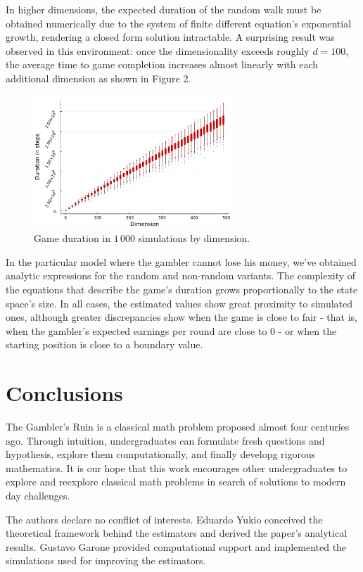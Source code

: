 \documentclass[a4paper,10pt,twocolumn]{article}
\begin{document}
In higher dimensions, the expected duration of the random walk must be obtained
numerically due to the system of finite different equation's exponential growth,
rendering a closed form solution intractable. A surprising result was observed
in this environment: once the dimensionality exceeds roughly $d=100$, the
average time to game completion increases almost linearly with each additional
dimension as shown in Figure 2.

\begin{figure}[h]
    \centering
    \includegraphics[width=7.5cm]{"boxplots-en.pdf"}
    \centering
    \caption{Game duration in $1\, 000$ simulations by dimension.}
\end{figure}

In the particular model where the gambler cannot lose his money, we've obtained
analytic expressions for the random and non-random variants. The complexity of
the equations that describe the game's duration grows proportionally to the
state space's size. In all cases, the estimated values show great proximity to
simulated ones, although greater discrepancies show when the game is close to
fair - that is, when the gambler's expected earnings per round are close to $0$
- or when the starting position is close to a boundary value.

\section{Conclusions}

The Gambler's Ruin is a classical math problem proposed almost four centuries
ago. Through intuition, undergraduates can formulate fresh questions and
hypothesis, explore them computationally, and finally developg rigorous
mathematics. It is our hope that this work encourages other undergraduates to
explore and reexplore classical math problems in search of solutions to modern
day challenges.

The authors declare no conflict of interests. Eduardo Yukio conceived the
theoretical framework behind the estimators and derived the paper's analytical
results. Gustavo Garone provided computational support and implemented the
simulations used for improving the estimators.
\end{document}
